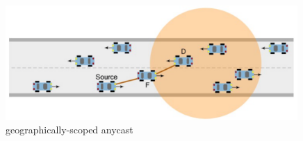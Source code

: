 \begin{figure}[H]
	\includegraphics[width=0.99\textwidth]{content/images/03_networklayer/GSA.png}
	\caption{geographically-scoped anycast \cite{etsi102636-1}}
	\label{fig:gsa}
\end{figure}


